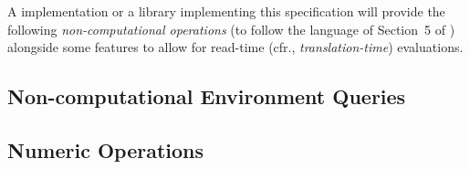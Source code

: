 \documentclass[../../CDR-IEEE-754-support.tex]{subfiles}
\begin{document}
\label{sect:fp-operations}

A \CL{} implementation or a \CL{} library implementing this
specification will provide the following \emph{non-computational
  operations} (to follow the language of Section~5 of \cite{2008:IEEE-754})
alongside some \CL{} features to allow for read-time (cfr.,
\emph{translation-time}) evaluations.



\subsection{Non-computational \CL{} Environment \IEEEFPStd{} Queries}
\label{sect:fp-environment-queries}



\newpage

\subsection{Numeric Operations}

\end{document}
